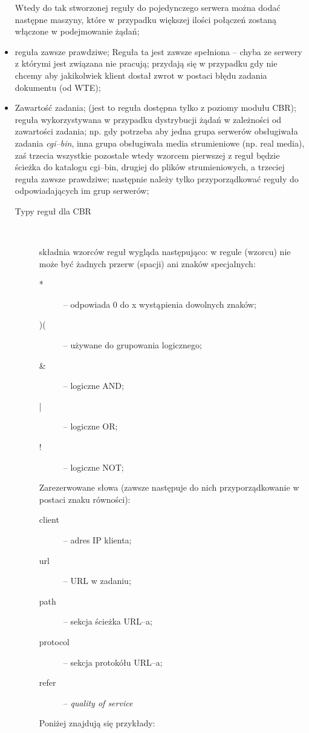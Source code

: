 \begin{itemize}
    Wtedy do tak stworzonej reguły do pojedynczego serwera można dodać następne maszyny, które w przypadku
    większej ilości połączeń zostaną włączone w podejmowanie żądań;
    \item reguła zawsze prawdziwe; Reguła ta jest zawsze spełniona -- chyba ze serwery z którymi jest związana
    nie pracują; przydają się w przypadku gdy nie chcemy aby jakikolwiek klient dostał zwrot w postaci błędu
    zadania dokumentu (od WTE);
    \item Zawartość zadania; (jest to reguła dostępna tylko z poziomy modułu CBR); reguła wykorzystywana
    w przypadku dystrybucji żądań w zależności od zawartości zadania; np. gdy potrzeba aby jedna grupa serwerów
    obsługiwała zadania \emph{cgi--bin}, inna grupa obsługiwała media strumieniowe (np. real media), zaś trzecia wszystkie
    pozostałe wtedy wzorcem pierwszej z reguł 
    będzie ścieżka do katalogu cgi--bin, drugiej do plików strumieniowych, a trzeciej reguła zawsze prawdziwe;
    następnie należy tylko przyporządkować reguły do odpowiadających im grup serwerów;
        \begin{description}
        \item[Typy reguł dla CBR]\

        składnia wzorców reguł wygląda następująco: w regule (wzorcu)  nie może być żadnych przerw (spacji)
        ani znaków specjalnych:
            \begin{description}
            \item[*] -- odpowiada 0 do x wystąpienia dowolnych znaków;
            \item[)(] -- używane do grupowania logicznego;
            \item[\&] -- logiczne AND;
            \item[|] -- logiczne OR;
            \item[!] -- logiczne NOT;
            \end{description}
        Zarezerwowane słowa (zawsze następuje do nich przyporządkowanie w postaci znaku równości):
            \begin{description}
            \item[client] -- adres IP klienta;
            \item[url] -- URL w zadaniu;
            \item[path] -- sekcja ścieżka URL--a;
            \item[protocol] -- sekcja protokółu URL--a;
            \item[refer] -- \emph{quality of service}
            \end{description}
        Poniżej znajdują się przykłady:\\


\end{description}
\end{itemize}
